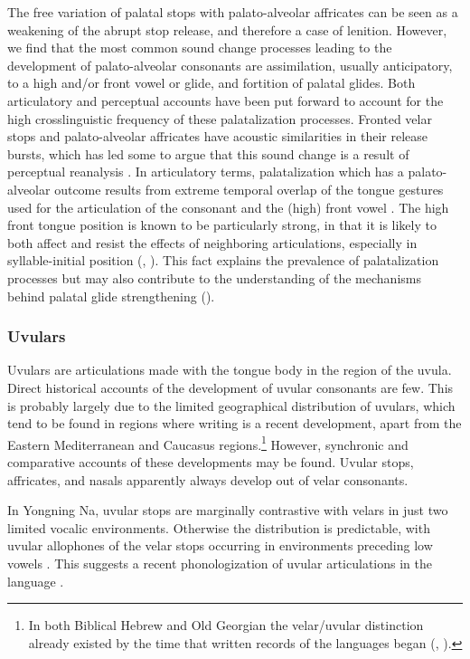   The free variation of palatal stops with palato-alveolar affricates can be seen as a weakening of the abrupt stop release, and therefore a case of lenition. However, we find that the most common sound change processes leading to the development of palato-alveolar consonants are assimilation, usually anticipatory, to a high and/or front vowel or glide, and fortition of palatal glides. Both articulatory and perceptual accounts have been put forward to account for the high crosslinguistic frequency of these palatalization processes. Fronted velar stops and palato-alveolar affricates have acoustic similarities in their release bursts, which has led some to argue that this sound change is a result of perceptual reanalysis \citep{Guion1998}. In articulatory terms, palatalization which has a palato-alveolar outcome results from extreme temporal overlap of the tongue gestures used for the articulation of the consonant and the (high) front vowel \citep{Bateman2007}. The high front tongue position is known to be particularly strong, in that it is likely to both affect and resist the effects of neighboring articulations, especially in syllable-initial position (\citealt{RecasensEspinosa2009}, \citealt{Recasens2014}). This fact explains the prevalence of palatalization processes but may also contribute to the understanding of the mechanisms behind palatal glide strengthening (\citealt{BybeeEasterday2019}).

\subsubsection{{Uvulars}}\label{sec:4.5.2.2}

  Uvulars are articulations made with the tongue body in the region of the uvula. Direct historical accounts of the development of uvular consonants are few. This is probably largely due to the limited geographical distribution of uvulars, which tend to be found in regions where writing is a recent development, apart from the Eastern Mediterranean and Caucasus regions.\footnote{ \textrm{In both Biblical Hebrew and Old Georgian the velar/uvular distinction already existed by the time that written records of the languages began (\citealt{Rendsburg1997}, \citealt{Butskhrikidze2002}).}}  However, synchronic and comparative accounts of these developments may be found. Uvular stops, affricates, and nasals apparently always develop out of velar consonants.

  In Yongning Na, uvular stops are marginally contrastive with velars in just two limited vocalic environments. Otherwise the distribution is predictable, with uvular allophones of the velar stops occurring in environments preceding low vowels . This suggests a recent phonologization of uvular articulations in the language \citep[28]{Lidz2010}.

